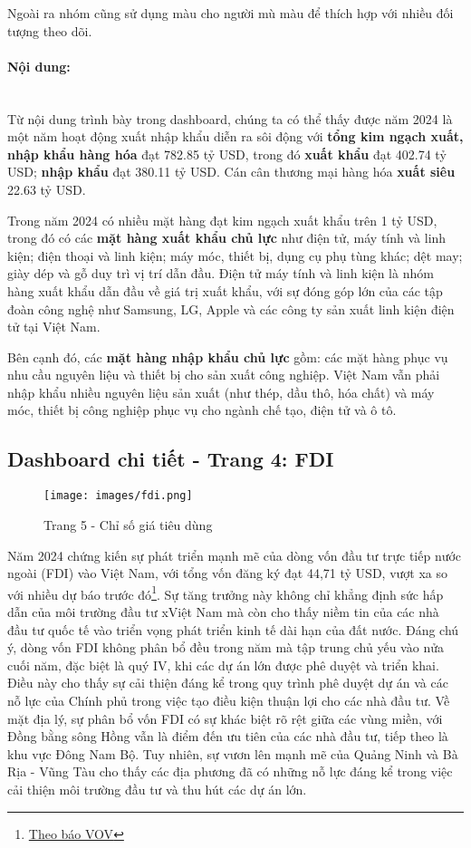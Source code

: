 \documentclass[a4paper]{report}
\begin{document}
{{Ngoài ra nhóm cũng sử dụng màu cho người mù màu để thích hợp với nhiều đối tượng theo dõi.

\paragraph{Nội dung:} \mbox{}\\
Từ nội dung trình bày trong dashboard, chúng ta có thể thấy được năm 2024 là một năm hoạt động xuất nhập khẩu diễn ra sôi động với \textbf{tổng kim ngạch xuất, nhập khẩu hàng hóa} đạt 782.85 tỷ USD, trong đó \textbf{xuất khẩu} đạt 402.74 tỷ USD; \textbf{nhập khẩu} đạt 380.11 tỷ USD. Cán cân thương mại hàng hóa \textbf{xuất siêu} 22.63 tỷ USD.

Trong năm 2024 có nhiều mặt hàng đạt kim ngạch xuất khẩu trên 1 tỷ USD, trong đó có các \textbf{mặt hàng xuất khẩu chủ lực} như điện tử, máy tính và linh kiện; điện thoại và linh kiện; máy móc, thiết bị, dụng cụ phụ tùng khác; dệt may; giày dép và gỗ duy trì vị trí dẫn đầu. Điện tử máy tính và linh kiện là nhóm hàng xuất khẩu dẫn đầu về giá trị xuất khẩu, với sự đóng góp lớn của các tập đoàn công nghệ như Samsung, LG, Apple và các công ty sản xuất linh kiện điện tử tại Việt Nam.

Bên cạnh đó, các \textbf{mặt hàng nhập khẩu chủ lực} gồm: các mặt hàng phục vụ nhu cầu nguyên liệu và thiết bị cho sản xuất công nghiệp. Việt Nam vẫn phải nhập khẩu nhiều nguyên liệu sản xuất (như thép, dầu thô, hóa chất) và máy móc, thiết bị công nghiệp phục vụ cho ngành chế tạo, điện tử và ô tô. 

\subsection{Dashboard chi tiết - Trang 4: FDI}
\begin{figure}[H]
    \centering
    \texttt{[image: images/fdi.png]}
    \caption{Trang 5 - Chỉ số giá tiêu dùng}
    \label{fig:enter-label}
\end{figure}

Năm 2024 chứng kiến sự phát triển mạnh mẽ của dòng vốn đầu tư trực tiếp nước ngoài (FDI) vào Việt Nam, với tổng vốn đăng ký đạt 44,71 tỷ USD, vượt xa so với nhiều dự báo trước đó\footnote{\href{https://vov.vn/kinh-te/3138-ty-usd-von-fdi-rot-vao-viet-nam-trong-11-thang-post1140227.vov}{Theo báo VOV}}.
Sự tăng trưởng này không chỉ khẳng định sức hấp dẫn của môi trường đầu tư xViệt Nam mà còn cho thấy niềm tin của các nhà đầu tư quốc tế vào triển vọng phát triển kinh tế dài hạn của đất nước. Đáng chú ý, dòng vốn FDI không phân bổ đều trong năm mà tập trung chủ yếu vào nửa cuối năm, đặc biệt là quý IV, khi các dự án lớn được phê duyệt và triển khai. Điều này cho thấy sự cải thiện đáng kể trong quy trình phê duyệt dự án và các nỗ lực của Chính phủ trong việc tạo điều kiện thuận lợi cho các nhà đầu tư. Về mặt địa lý, sự phân bổ vốn FDI có sự khác biệt rõ rệt giữa các vùng miền, với Đồng bằng sông Hồng vẫn là điểm đến ưu tiên của các nhà đầu tư, tiếp theo là khu vực Đông Nam Bộ. Tuy nhiên, sự vươn lên mạnh mẽ của Quảng Ninh và Bà Rịa - Vũng Tàu cho thấy các địa phương đã có những nỗ lực đáng kể trong việc cải thiện môi trường đầu tư và thu hút các dự án lớn.\\

}}
\end{document}
